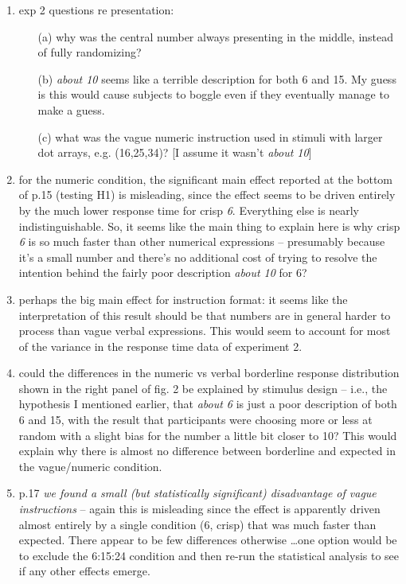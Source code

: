 \documentclass{tufte-handout}
\begin{document}
\begin{enumerate}
\item
exp 2 questions re presentation: 
\begin{itemize}
\item [(a)]
why was the central number always presenting in the middle, instead of fully randomizing?
\item [(b)]
\emph{about 10} seems like a terrible description for both 6 and 15. My guess is this would cause subjects to boggle even if they eventually manage to make a guess.
\item [(c)]
what was the vague numeric instruction used in stimuli with larger dot arrays, e.g. (16,25,34)? [I assume it wasn't \emph{about 10}]
\end{itemize}
\item
for the numeric condition, the significant main effect reported at the bottom of p.15 (testing H1) is misleading, since the effect seems to be driven entirely by the much lower response time for crisp \emph{6}. Everything else is nearly indistinguishable. So, it seems like the main thing to explain here is why crisp \emph{6} is so much faster than other numerical expressions -- presumably because it's a small number and there's no additional cost of trying to resolve the intention behind the fairly poor description \emph{about 10} for 6?
\item
perhaps the big main effect for instruction format: it seems like the interpretation of this result should be that numbers are in general harder to process than vague verbal expressions. This would seem to account for most of the variance in the response time data of experiment 2.
\item
could the differences in the numeric vs verbal borderline response distribution shown in the right panel of fig. 2 be explained by stimulus design -- i.e., the hypothesis I mentioned earlier, that \emph{about 6} is just a poor description of both 6 and 15, with the result that participants were choosing more or less at random with a slight bias for the number a little bit closer to 10? This would explain why there is almost no difference between borderline and expected in the vague/numeric condition.
\item
p.17 \emph{we found a small (but statistically significant) disadvantage of vague instructions} -- again this is misleading since the effect is apparently driven almost entirely by a single condition (6, crisp) that was much faster than expected. There appear to be few differences otherwise \ldots one option would be to exclude the 6:15:24 condition and then re-run the statistical analysis to see if any other effects emerge.

\end{enumerate}
\end{document}
